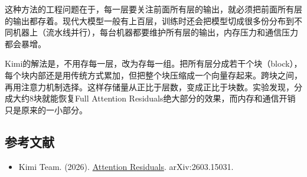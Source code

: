 这种方法的工程问题在于，每一层要关注前面所有层的输出，就必须把前面所有层的输出都存着。现代大模型一般有上百层，训练时还会把模型切成很多份分布到不同机器上（流水线并行），每台机器都要维护所有层的输出，内存压力和通信压力都会暴增。

Kimi的解法是，不用存每一层，改为存每一组。把所有层分成若干个块（block），每个块内部还是用传统方式累加，但把整个块压缩成一个向量存起来。跨块之间，再用注意力机制选择。这样存储量从正比于层数，变成正比于块数。实验发现，分成大约8块就能恢复Full Attention Residuals绝大部分的效果，而内存和通信开销只是原来的一小部分。

\FloatBarrier
{}
\hypertarget{ux53c2ux8003ux6587ux732e-104}{%
\subsection{参考文献}\label{ux53c2ux8003ux6587ux732e-104}}

\vspace{0.25em}
\begin{itemize}
\tightlist
\item
  Kimi Team. (2026). \href{https://arxiv.org/abs/2603.15031}{Attention Residuals}. arXiv:2603.15031.
\end{itemize}

\clearpage
